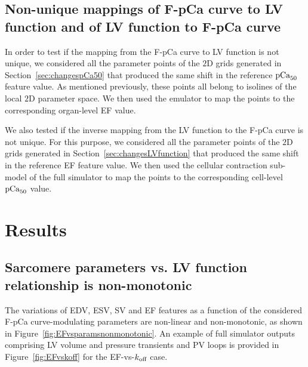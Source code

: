 %
%
%
\subsection{Non-unique mappings of F-pCa curve to LV function and of LV function to F-pCa curve}
In order to test if the mapping from the F-pCa curve to LV function is not unique, we considered all the parameter points of the $2$D grids generated in Section~\ref{sec:changespCa50} that produced the same shift in the reference $\textrm{pCa}_{50}$ feature value. As mentioned previously, these points all belong to isolines of the local $2$D parameter space. We then used the emulator to map the points to the corresponding organ-level EF value.

\vspace{0.2cm}
We also tested if the inverse mapping from the LV function to the F-pCa curve is not unique. For this purpose, we considered all the parameter points of the $2$D grids generated in Section~\ref{sec:changesLVfunction} that produced the same shift in the reference EF feature value. We then used the cellular contraction sub-model of the full simulator to map the points to the corresponding cell-level $\textrm{pCa}_{50}$ value.


%
%
%
\section{Results}


%
%
%
\subsection{Sarcomere parameters vs. LV function relationship is non-monotonic}
The variations of EDV, ESV, SV and EF features as a function of the considered F-pCa curve-modulating parameters are non-linear and non-monotonic, as shown in Figure~\ref{fig:EFvsparamsnonmonotonic}. An example of full simulator outputs comprising LV volume and pressure transients and PV loops is provided in Figure~\ref{fig:EFvskoff} for the EF-vs-$k_{\textrm{off}}$ case.

